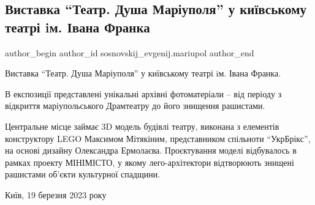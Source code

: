  
 
 
 
 

\subsection{Виставка \enquote{Театр. Душа Маріуполя} у київському театрі iм. Івана Франка}
\label{sec:20_03_2023.fb.sosnovskij_evgenij.mariupol.1.vistavka__teatr__dus}

\ifcmt
 author_begin
   author_id sosnovskij_evgenij.mariupol
 author_end
\fi

Виставка \enquote{Театр. Душа Маріуполя} у київському театрі iм. Івана Франка.

В експозиції представлені унікальні архівні фотоматеріали – від періоду з
відкриття маріупольського Драмтеатру до його знищення рашистами.

Центральне місце займає 3D модель будівлі театру, виконана з елементів
конструктору LEGO Максимом Мітякіним, представником спільноти \enquote{УкрБрікс}, на
основі дизайну Олександра Ермолаєва. Проєктування моделі відбувалось в рамках
проекту МІНІМІСТО, у якому лего-архітектори відтворюють знищені рашистами
об'єкти культурної спадщини.

Київ, 19 березня 2023 року

